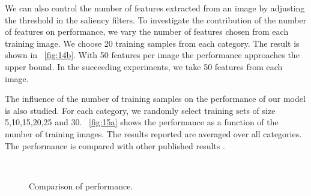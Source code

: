 \documentclass[twocolumn]{article}
\begin{document}
We can also control the number of features extracted from an image by adjusting the threshold in the saliency filters. 
To investigate the contribution of the number of features on performance, we vary the number of features chosen from each training image.
We choose 20 training samples from each category.
The result is shown in \figurename~\ref{fig:14b}.
With 50 features per image the performance approaches the upper bound.
In the succeeding experiments, we take 50 features from each image.

The influence of the number of training samples on the performance of our model is also studied.
For each category, we randomly select training sets of size 5,10,15,20,25 and 30.
\figurename~\ref{fig:15a} shows the performance as a function of the number of training images.
The results reported are averaged over all categories.
The performance is compared with other published results \cite{grauman2005,lazebnik2006,zhang2006,wang2006,bosch2007,boiman2008,liu2013,heo2014}.

\begin{figure}[!t]
\centering
  \\
\caption{Comparison of performance.}
\label{fig:15}
\end{figure}
\end{document}

